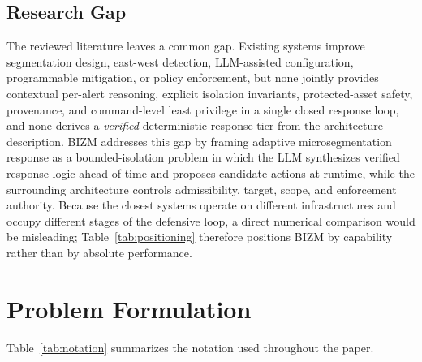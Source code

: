 \documentclass[final,5p]{elsarticle}
\begin{document}
\subsection{Research Gap}
\label{sec:rw_gap}

The reviewed literature leaves a common gap. Existing systems improve segmentation design, east-west detection, LLM-assisted configuration, programmable mitigation, or policy enforcement, but none jointly provides contextual per-alert reasoning, explicit isolation invariants, protected-asset safety, provenance, and command-level least privilege in a single closed response loop, and none derives a \emph{verified} deterministic response tier from the architecture description. BIZM addresses this gap by framing adaptive microsegmentation response as a bounded-isolation problem in which the LLM synthesizes verified response logic ahead of time and proposes candidate actions at runtime, while the surrounding architecture controls admissibility, target, scope, and enforcement authority. Because the closest systems operate on different infrastructures and occupy different stages of the defensive loop, a direct numerical comparison would be misleading; Table~\ref{tab:positioning} therefore positions BIZM by capability rather than by absolute performance.

\section{Problem Formulation}
\label{sec:problem}

Table~\ref{tab:notation} summarizes the notation used throughout the paper.
\end{document}

